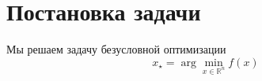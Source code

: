 \documentclass{article}
\begin{document}
\begin{comment}
\begin{algorithm}[!ht]
caption{ Intermediate  Similar Triangle Method (\texttt{ISTM}).}\label{alg_STM_relative}
\begin{algorithmic}[1]
   \REQUIRE Initial point $x^0$, number of iterations $N$, smoothness constant  $L>0$, and step size parameter $a \geq 1$, intermediate parameter $p \in [1,2]$. 
   \STATE Set $A_0 = \alpha_0 = 0, y^0 = z^0 = x^0$.
   \FOR{$k=0,1 ,  \ldots, N-1$}
   \STATE Set $\alpha_{k+1} = \frac{(k+2)^{p-1}}{2aL}, \, A_{k+1} = \alpha_{k+1} + A_k$. \label{item_3}
   \STATE $x^{k+1} = \frac{1}{A_{k+1}} \left(A_k y^k + \alpha_{k+1} z^k\right) $. \label{item_4}
   \STATE $z^{k+1} = z^k - \alpha_{k+1} \widetilde{\nabla} f(x^{k+1})$.
   \STATE $y^{k+1} = \frac{1}{A_{k+1}} \left(A_k y^k + \alpha_{k+1} z^{k+1}\right)$.
   \ENDFOR
    \ENSURE 
	$y^N$.
\end{algorithmic}
\end{algorithm}
\end{comment}


\section{Постановка задачи}
Мы решаем задачу безусловной оптимизации 
\begin{equation} \label{opt_problem}
    x_{\star} = \arg \min_{x \in \mathbb{R}^n} f(x)
\end{equation}
\end{document}
